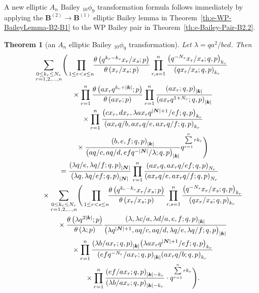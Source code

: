 \documentclass[pdftex]{sigma}
\numberwithin{equation}{section}
\newtheorem{Theorem}{Theorem}[section]
\newcommand{\sumN}{{\left| \boldsymbol{N} \right|}}
\newcommand\sumk{{\left| \boldsymbol{k} \right|}}
\newcommand{\B}{{ \mathbf B}}
\newcommand{\multsum}[3]{{\sum\limits_{\substack{{0\le #1_#3 \le #2_#3} \\
{#3 =1,2,\dots, n}}}}}
\newcommand{\triprod}[1]{\prod\limits_{1\le r < s \le #1}}
\newcommand{\sqprod}[1]{\prod\limits_{r, s =1}^{#1}} %
\newcommand{\smallprod}[1]{\prod\limits_{r =1}^{#1}} %
\newcommand{\xover}[1]{#1_{r}/#1_{s}}
\newcommand{\ellipticqrfac}[2]{{\left({#1}; q, p\right)_{#2}}} %
\newcommand{\elliptictheta}[1]{\theta \left({#1} ; p\right) }
\newcommand{\ellipticvandermonde}[3]{\triprod{#3} %
\!\! \frac{\elliptictheta{q^{#2_r-#2_s} \xover {#1} }}{\elliptictheta{\xover{#1}}}
}
\begin{document}
A new elliptic $A_n$ Bailey $_{10}\phi_9$ transformation formula follows immediately by applying the $\B^{(2)} \to\B^{(1)}$ elliptic Bailey lemma in Theorem~\ref{th:e-WP-BaileyLemma-B2-B1} to the WP Bailey pair in Theorem~\ref{th:e-Bailey-Pair-B2.2}.

\begin{Theorem}[an $A_n$ elliptic Bailey $_{10}\phi_9$ transformation] \label{th:e-10p9-6}
Let $\lambda = qa^2/bcd$. Then
\begin{gather}
\multsum{k}{N}{r} \Bigg( \ellipticvandermonde{x}{k}{n}
\sqprod n \frac{\ellipticqrfac{q^{-N_s}\xover{x}}{k_r} }{\ellipticqrfac{q\xover{x}}{k_r} } \notag \\
\qquad\quad{} \times \smallprod n \frac{\elliptictheta{a x_r q^{k_r+\sumk}}}{\elliptictheta{a x_r}}
 \smallprod n \frac{\ellipticqrfac{a x_r}{\sumk}}
 {\ellipticqrfac{a x_rq^{1+N_r}}{\sumk}} \notag\\
\qquad\quad{} \times \smallprod n \frac{\ellipticqrfac{cx_r, dx_r, \lambda ax_r q^{\sumN+1}/ef}{k_r}}
 {\ellipticqrfac{a x_rq/b, a x_rq/e, ax_rq/f}{k_r}} \notag\\
\qquad\quad{} \times \frac{\ellipticqrfac{b, e, f}{\sumk}}
{\ellipticqrfac{aq/c, aq/d, efq^{-\sumN}/\lambda}{\sumk}}
q^{\sum\limits_{r=1}^n r k_r} \Bigg)\notag \\
\qquad{} = \frac{\ellipticqrfac{\lambda q/e, \lambda q/f}{\sumN}}{\ellipticqrfac{ \lambda q, \lambda q/ef}{\sumN}}
\smallprod n \frac{\ellipticqrfac{a x_rq, a x_r q/ef}{N_r}}
{\ellipticqrfac{a x_rq/e, a x_rq/f}{N_r}}\notag \\
\qquad\quad{} \times \multsum{k}{N}{r} \Bigg( \ellipticvandermonde{x}{k}{n}
\sqprod n \frac{\ellipticqrfac{q^{-N_s}\xover{x}}{k_r} }{\ellipticqrfac{q\xover{x}}{k_r} } \notag \\
\qquad\quad{} \times \frac{\elliptictheta{\lambda q^{2\sumk}}}{\elliptictheta{\lambda }}
\frac{\ellipticqrfac{\lambda ,\lambda c/a, \lambda d/a, e, f}{\sumk}}
{\ellipticqrfac{\lambda q^{\sumN+1}, aq/c, aq/d, \lambda q/e, \lambda q/f}{\sumk}}\nonumber\\
\qquad\quad{} \times \smallprod n \frac{\ellipticqrfac{\lambda b/ax_r }{\sumk}
\ellipticqrfac{\lambda a x_r q^{\sumN+1}/ef}{k_r} }
{\ellipticqrfac{efq^{-N_r}/ax_r}{\sumk} \ellipticqrfac{ax_rq/b}{k_r} } \notag \\
\qquad\quad{} \times \smallprod n \frac{\ellipticqrfac{ef/ax_r}{\sumk-k_r}}
{\ellipticqrfac{\lambda b/ax_r}{\sumk-k_r}
} \cdot q^{\sum\limits_{r=1}^n r k_r} \Bigg). \label{e-10p9-6}
\end{gather}
\end{Theorem}
\end{document}
